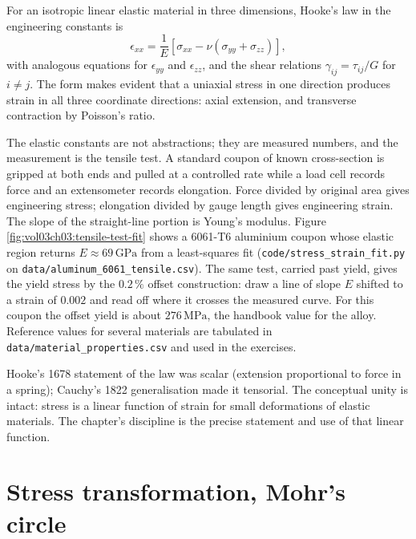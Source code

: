 For an isotropic linear elastic material in three dimensions, Hooke's
law in the engineering constants is
\[
\epsilon_{xx} = \frac{1}{E}\left[\sigma_{xx} - \nu(\sigma_{yy} +
\sigma_{zz})\right],
\]
with analogous equations for $\epsilon_{yy}$ and $\epsilon_{zz}$,
and the shear relations $\gamma_{ij} = \tau_{ij} / G$ for $i \neq j$.
The form makes evident that a uniaxial stress in one direction
produces strain in all three coordinate directions: axial extension,
and transverse contraction by Poisson's ratio.



The elastic constants are not abstractions; they are measured numbers,
and the measurement is the tensile test. A standard coupon of known
cross-section is gripped at both ends and pulled at a controlled rate
while a load cell records force and an extensometer records elongation.
Force divided by original area gives engineering stress; elongation
divided by gauge length gives engineering strain. The slope of the
straight-line portion is Young's modulus. Figure
\ref{fig:vol03ch03:tensile-test-fit} shows a 6061-T6 aluminium coupon
whose elastic region returns $E \approx 69\,\text{GPa}$ from a
least-squares fit (\texttt{code/stress\_strain\_fit.py} on
\texttt{data/aluminum\_6061\_tensile.csv}). The same test, carried past
yield, gives the yield stress by the $0.2\,\%$ offset construction: draw
a line of slope $E$ shifted to a strain of $0.002$ and read off where it
crosses the measured curve. For this coupon the offset yield is about
$276\,\text{MPa}$, the handbook value for the alloy. Reference values
for several materials are tabulated in
\texttt{data/material\_properties.csv} and used in the exercises.

Hooke's 1678 statement of the law was scalar (extension proportional
to force in a spring); Cauchy's 1822 generalisation made it tensorial.
The conceptual unity is intact: stress is a linear function of strain
for small deformations of elastic materials. The chapter's discipline
is the precise statement and use of that linear function.

\section{Stress transformation, Mohr's circle}

